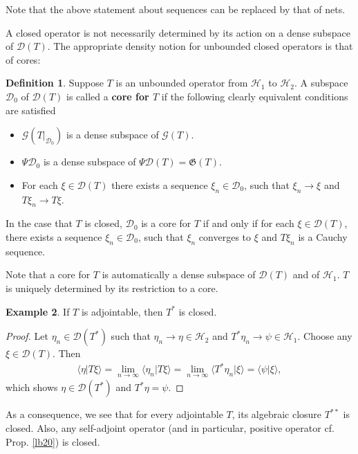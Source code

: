 \documentclass[12pt,b5paper,notitlepage]{article}
\theoremstyle{definition}
\newtheorem{df}{Definition}[section]
\newtheorem{eg}[df]{Example}
\theoremstyle{plain}
\newcommand{\fk}{\mathfrak}
\newcommand{\mc}{\mathcal}
\newcommand{\Dom}{\scr D}
\newcommand{\bk}[1]{\langle {#1}\rangle}
\newcommand{\scr}{\mathscr}
\numberwithin{equation}{section}
\begin{document}
Note that the above statement about sequences can be replaced by that of nets.


A closed operator is not necessarily determined by its action on a dense subspace of $\Dom(T)$. The appropriate density notion for unbounded closed operators is that of cores:

\begin{df}
Suppose $T$ is an unbounded operator from $\mc H_1$ to $\mc H_2$. A  subspace $\Dom_0$ of $\Dom(T)$ is called a \textbf{core for $T$} if the following clearly equivalent conditions are satisfied
\begin{itemize}
		\item $\scr G(T|_{\Dom_0})$ is a dense subspace of $\scr G(T)$.
		\item $\Psi\Dom_0$ is a dense subspace of $\Psi\Dom(T)=\fk G(T)$.
		\item For each $\xi\in\Dom(T)$ there exists a sequence $\xi_n\in\Dom_0$, such that $\xi_n\rightarrow\xi$ and $T\xi_n\rightarrow T\xi$.
\end{itemize} 
In the case that $T$ is closed, $\Dom_0$ is a core for $T$ if and only if for each $\xi\in\Dom(T)$, there exists a sequence $\xi_n\in\Dom_0$, such that $\xi_n$ converges to $\xi$ and $T\xi_n$ is a Cauchy sequence.
\end{df}

Note that a core for $T$ is automatically a dense subspace of $\Dom(T)$ and of $\mc H_1$. $T$ is uniquely determined by its restriction to a core.










\begin{eg}\label{lb23}
If $T$ is adjointable, then $T^*$ is closed.
\end{eg}

\begin{proof}
Let $\eta_n\in\Dom(T^*)$ such that $\eta_n\rightarrow\eta\in\mc H_2$ and $T^*\eta_n\rightarrow\psi\in\mc H_1$. Choose any $\xi\in\Dom(T)$. Then
\begin{align*}
\bk{\eta|T\xi}=\lim_{n\rightarrow\infty}\bk{\eta_n|T\xi}=\lim_{n\rightarrow\infty}\bk{T^*\eta_n|\xi}=\bk{\psi|\xi},
\end{align*}
which shows $\eta\in\Dom(T^*)$ and $T^*\eta=\psi$.
\end{proof}

As a consequence, we see that for every adjointable $T$, its algebraic closure $T^{**}$ is closed. Also, any self-adjoint operator (and in particular, positive operator cf. Prop. \ref{lb20}) is closed.
\end{document}
